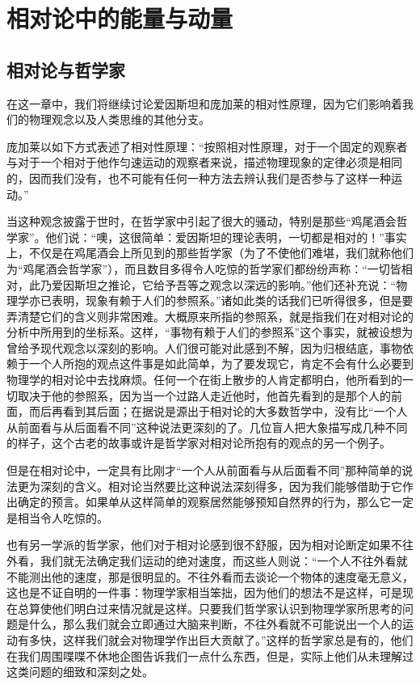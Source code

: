\chapter{相对论中的能量与动量}

\section{相对论与哲学家}

在这一章中，我们将继续讨论爱因斯坦和庞加莱的相对性原理，因为它们影响着我们的物理观念以及人类思维的其他分支。

庞加莱以如下方式表述了相对性原理：“按照相对性原理，对于一个固定的观察者与对于一个相对于他作匀速运动的观察者来说，描述物理现象的定律必须是相同的，因而我们没有，也不可能有任何一种方法去辨认我们是否参与了这样一种运动。”

当这种观念披露于世时，在哲学家中引起了很大的骚动，特别是那些“鸡尾酒会哲学家”。他们说：“噢，这很简单：爱因斯坦的理论表明，一切都是相对的！”事实上，不仅是在鸡尾酒会上所见到的那些哲学家（为了不使他们难堪，我们就称他们为“鸡尾酒会哲学家”），而且数目多得令人吃惊的哲学家们都纷纷声称：“一切皆相对，此乃爱因斯坦之推论，它给予吾等之观念以深远的影响。”他们还补充说：“物理学亦已表明，现象有赖于人们的参照系。”诸如此类的话我们已听得很多，但是要弄清楚它们的含义则非常困难。大概原来所指的参照系，就是指我们在对相对论的分析中所用到的坐标系。这样，“事物有赖于人们的参照系”这个事实，就被设想为曾给予现代观念以深刻的影响。人们很可能对此感到不解，因为归根结底，事物依赖于一个人所抱的观点这件事是如此简单，为了要发现它，肯定不会有什么必要到物理学的相对论中去找麻烦。任何一个在街上散步的人肯定都明白，他所看到的一切取决于他的参照系，因为当一个过路人走近他时，他首先看到的是那个人的前面，而后再看到其后面；在据说是源出于相对论的大多数哲学中，没有比“一个人从前面看与从后面看不同”这种说法更深刻的了。几位盲人把大象描写成几种不同的样子，这个古老的故事或许是哲学家对相对论所抱有的观点的另一个例子。

但是在相对论中，一定具有比刚才“一个人从前面看与从后面看不同”那种简单的说法更为深刻的含义。相对论当然要比这种说法深刻得多，因为我们能够借助于它作出确定的预言。如果单从这样简单的观察居然能够预知自然界的行为，那么它一定是相当令人吃惊的。

也有另一学派的哲学家，他们对于相对论感到很不舒服，因为相对论断定如果不往外看，我们就无法确定我们运动的绝对速度，而这些人则说：“一个人不往外看就不能测出他的速度，那是很明显的。不往外看而去谈论一个物体的速度毫无意义，这也是不证自明的一件事：物理学家相当笨拙，因为他们的想法不是这样，可是现在总算使他们明白过来情况就是这样。只要我们哲学家认识到物理学家所思考的问题是什么，那么我们就会立即通过大脑来判断，不往外看就不可能说出一个人的运动有多快，这样我们就会对物理学作出巨大贡献了。”这样的哲学家总是有的，他们在我们周围喋喋不休地企图告诉我们一点什么东西，但是，实际上他们从未理解过这类问题的细致和深刻之处。

